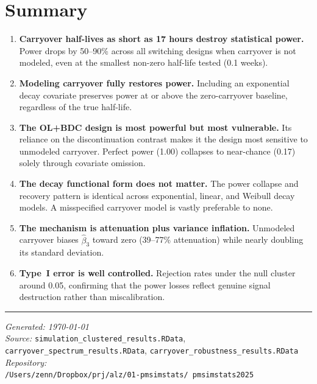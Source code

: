 \documentclass[11pt]{article}
\begin{document}
\section{Summary}

\begin{enumerate}
  \item \textbf{Carryover half-lives as short as 17 hours
    destroy statistical power.}
    Power drops by 50--90\% across all switching designs
    when carryover is not modeled, even at the smallest
    non-zero half-life tested (0.1 weeks).

  \item \textbf{Modeling carryover fully restores power.}
    Including an exponential decay covariate preserves
    power at or above the zero-carryover baseline,
    regardless of the true half-life.

  \item \textbf{The OL+BDC design is most powerful but
    most vulnerable.}
    Its reliance on the discontinuation contrast makes
    it the design most sensitive to unmodeled carryover.
    Perfect power (1.00) collapses to near-chance (0.17)
    solely through covariate omission.

  \item \textbf{The decay functional form does not matter.}
    The power collapse and recovery pattern is identical
    across exponential, linear, and Weibull decay models.
    A misspecified carryover model is vastly preferable to
    none.

  \item \textbf{The mechanism is attenuation plus variance
    inflation.}
    Unmodeled carryover biases $\hat{\beta}_3$ toward
    zero (39--77\% attenuation) while nearly doubling
    its standard deviation.

  \item \textbf{Type~I error is well controlled.}
    Rejection rates under the null cluster around 0.05,
    confirming that the power losses reflect genuine
    signal destruction rather than miscalibration.
\end{enumerate}

\vspace{1cm}

\noindent\rule{\textwidth}{0.4pt}

\noindent\textit{Generated: \today}\\
\textit{Source:}
\texttt{simulation\_clustered\_results.RData},\\
\texttt{carryover\_spectrum\_results.RData},
\texttt{carryover\_robustness\_results.RData}\\
\textit{Repository:}\\
\texttt{/Users/zenn/Dropbox/prj/alz/01-pmsimstats/%
pmsimstats2025}
\end{document}
